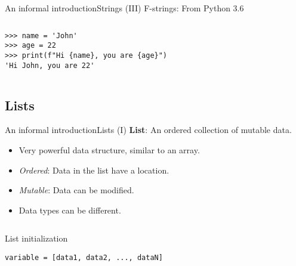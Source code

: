 \documentclass[10pt,compress]{beamer} %
\begin{document}
\begin{frame}[fragile]{An informal introduction}{Strings (III)}
	\vspace{-0.2cm}
	F-strings: From Python 3.6
	\vspace{-0.3cm}
	\begin{columns}
\begin{block}{}
\begin{verbatim}
>>> name = 'John'
>>> age = 22
>>> print(f"Hi {name}, you are {age}")
'Hi John, you are 22'
\end{verbatim}
\end{block}
\end{columns}
\end{frame}



\subsection{Lists}
\begin{frame}[fragile]{An informal introduction}{Lists (I)}
	\textbf{List}: An ordered collection of mutable data.
	\begin{itemize}
		\item Very powerful data structure, similar to an array.
		\item \textit{Ordered}: Data in the list have a location.
		\item \textit{Mutable}: Data can be modified.
		\item Data types can be different.
	\end{itemize}
	\begin{columns}
		\begin{block}{List initialization}
		\begin{verbatim}
variable = [data1, data2, ..., dataN]
\end{verbatim}
		\end{block}
	\end{columns}
\end{frame}
\end{document}
